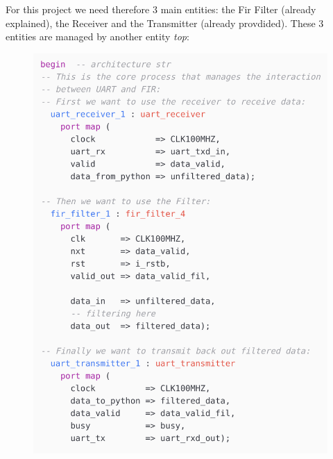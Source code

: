 \documentclass[11pt,a4paper,twocolumn]{IEEEtran}
\begin{document}
	For this project we need therefore 3 main entities: the Fir Filter (already explained), the Receiver and the Transmitter (already provdided). These 3 entities are managed by another entity \emph{top}:
	\begin{figure}[h]
		\centering
		\hspace*{-.8cm}\includegraphics[width=1.1\linewidth]{img/code1}
	\end{figure}\newpage
\end{document}
